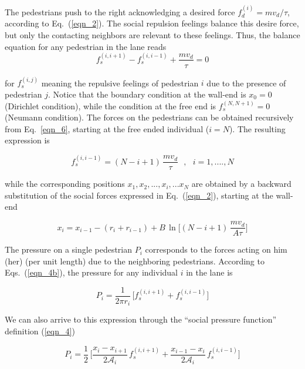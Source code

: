 The pedestrians push to the right acknowledging a desired force 
$f_d^{(i)}=mv_d/\tau$, according to Eq.~(\ref{eqn_2}). The social repulsion 
feelings balance this desire force, but only the contacting neighbors are 
relevant to these feelings. Thus, the balance equation for any pedestrian 
in the lane reads \\

\begin{equation}
 f_s^{(i,i+1)}-f_s^{(i,i-1)}+\displaystyle\frac{mv_d}{\tau}=0\label{eqn_6}
\end{equation}

\noindent for $f_s^{(i,j)}$ meaning the repulsive feelings of pedestrian $i$ 
due to the presence of pedestrian $j$. Notice that the boundary condition at 
the wall-end is $x_0=0$ (Dirichlet condition), while the condition at the free 
end is $f_s^{(N,N+1)}=0$ (Neumann condition). The forces on the pedestrians can 
be obtained recursively from Eq.~\ref{eqn_6}, starting at the free ended 
individual ($i=N$). The resulting expression is 

\begin{equation}
f_s^{(i,i-1)}=(N-i+1)\,\displaystyle\frac{mv_d}{\tau}\ \ \ , \ \ \ 
i=1,....,N\label{eqn_7}
\end{equation}

\noindent while the corresponding positions $x_1,x_2,...,x_{i},...x_N$ are 
obtained by a backward substitution of the social forces expressed in 
Eq.~(\ref{eqn_2}), starting at the wall-end

\begin{equation} 
x_i=x_{i-1}-(r_{i}+r_{i-1})+B\,\ln\bigg[(N-i+1)\,\displaystyle\frac{mv_d}{A\tau}
\bigg]\label{eqn_8}
\end{equation}


The pressure on a single pedestrian $P_i$ corresponds to the forces acting on 
him (her) (per unit length) due to the neighboring pedestrians. According to 
Eqs.~(\ref{eqn_4b}), the pressure for any individual $i$ in the lane is  

\begin{equation}
P_i=\displaystyle\frac{1}{2\pi 
r_i}\,\bigg[f_s^ { (i , i+1) } +f_s^{(i,i-1)}\bigg]\label{eqn_10}
\end{equation}

We can also arrive to this expression through the ``social pressure 
function'' definition (\ref{eqn_4}) 

\begin{equation}
P_i=\displaystyle\frac{1}{2}\,\bigg[\displaystyle\frac{x_{i}-x_{i+1}}{
2\mathcal{A}_i } \,
f_s^ { (i , i+1) } +\displaystyle\frac { 
x_{i-1}-x_{i}}{2\mathcal{A}_i}\,f_s^{(i,i-1)}\bigg]\label{eqn_9}
\end{equation}

